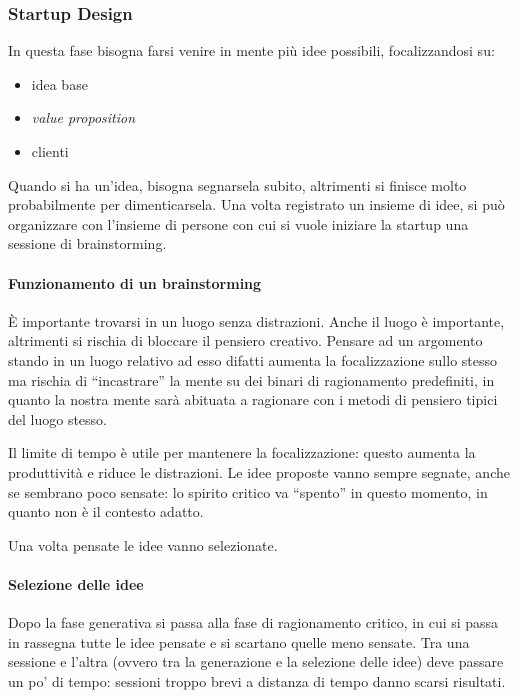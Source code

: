 \subsubsection{Startup Design}

In questa fase bisogna farsi venire in mente più idee possibili, focalizzandosi
su:
\begin{itemize}
 \item idea base
 \item \textit{value proposition}
 \item clienti
\end{itemize}

Quando si ha un'idea, bisogna segnarsela subito, altrimenti si finisce molto
probabilmente per dimenticarsela. Una volta registrato un insieme di idee, si
può organizzare con l'insieme di persone con cui si vuole iniziare la startup
una sessione di brainstorming.

\paragraph*{Funzionamento di un brainstorming} È importante trovarsi in un
luogo senza distrazioni. Anche il luogo è importante, altrimenti si rischia di
bloccare il pensiero creativo. Pensare ad un argomento stando in un luogo
relativo ad esso difatti aumenta la focalizzazione sullo stesso ma rischia di
``incastrare'' la mente su dei binari di ragionamento predefiniti, in quanto la
nostra mente sarà abituata a ragionare con i metodi di pensiero tipici del
luogo stesso.

Il limite di tempo è utile per mantenere la focalizzazione: questo aumenta la
produttività e riduce le distrazioni. Le idee proposte vanno sempre segnate,
anche se sembrano poco sensate: lo spirito critico va ``spento'' in questo
momento, in quanto non è il contesto adatto.

Una volta pensate le idee vanno selezionate.

\paragraph*{Selezione delle idee} Dopo la fase generativa si passa alla fase di
ragionamento critico, in cui si passa in rassegna tutte le idee pensate e si
scartano quelle meno sensate. Tra una sessione e l'altra (ovvero tra la
generazione e la selezione delle idee) deve passare un po' di tempo: sessioni
troppo brevi a distanza di tempo danno scarsi risultati.

